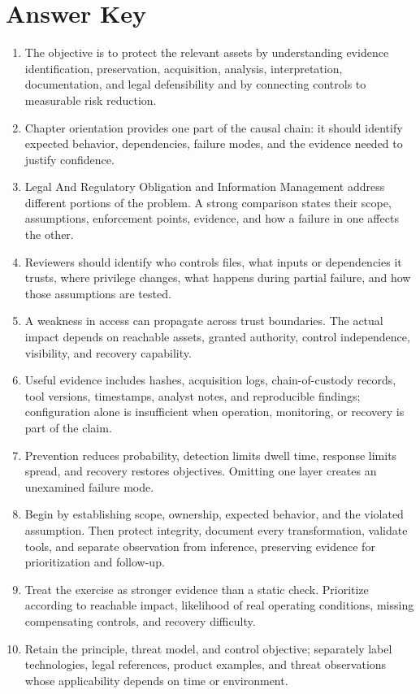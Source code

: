 \documentclass[11pt]{article}
\begin{document}
\section*{Answer Key}
\begin{enumerate}
\item The objective is to protect the relevant assets by understanding evidence identification, preservation, acquisition, analysis, interpretation, documentation, and legal defensibility and by connecting controls to measurable risk reduction.
\item Chapter orientation provides one part of the causal chain: it should identify expected behavior, dependencies, failure modes, and the evidence needed to justify confidence.
\item Legal And Regulatory Obligation and Information Management address different portions of the problem. A strong comparison states their scope, assumptions, enforcement points, evidence, and how a failure in one affects the other.
\item Reviewers should identify who controls files, what inputs or dependencies it trusts, where privilege changes, what happens during partial failure, and how those assumptions are tested.
\item A weakness in access can propagate across trust boundaries. The actual impact depends on reachable assets, granted authority, control independence, visibility, and recovery capability.
\item Useful evidence includes hashes, acquisition logs, chain-of-custody records, tool versions, timestamps, analyst notes, and reproducible findings; configuration alone is insufficient when operation, monitoring, or recovery is part of the claim.
\item Prevention reduces probability, detection limits dwell time, response limits spread, and recovery restores objectives. Omitting one layer creates an unexamined failure mode.
\item Begin by establishing scope, ownership, expected behavior, and the violated assumption. Then protect integrity, document every transformation, validate tools, and separate observation from inference, preserving evidence for prioritization and follow-up.
\item Treat the exercise as stronger evidence than a static check. Prioritize according to reachable impact, likelihood of real operating conditions, missing compensating controls, and recovery difficulty.
\item Retain the principle, threat model, and control objective; separately label technologies, legal references, product examples, and threat observations whose applicability depends on time or environment.
\end{enumerate}
\end{document}

